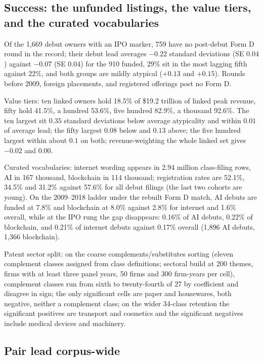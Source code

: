 \subsection{Success: the unfunded listings, the value tiers, and the curated vocabularies}

Of the 1{,}669 debut owners with an IPO marker, 759 have no post-debut
Form D round in the record; their debut lead averages $-0.22$ standard
deviations (SE $0.04$) against $-0.07$ (SE $0.04$) for the 910 funded,
29\% sit in the most lagging fifth against 22\%, and both groups are
mildly atypical ($+0.13$ and $+0.15$). Rounds before 2009, foreign
placements, and registered offerings post no Form D.

Value tiers: ten linked owners hold 18.5\% of \$19.2 trillion of linked
peak revenue, fifty hold 41.5\%, a hundred 53.6\%, five hundred 82.9\%,
a thousand 92.6\%. The ten largest sit $0.35$ standard deviations below
average atypicality and within $0.01$ of average lead; the fifty largest
$0.08$ below and $0.13$ above; the five hundred largest within about
$0.1$ on both; revenue-weighting the whole linked set gives $-0.02$ and
$0.00$.

Curated vocabularies: internet wording appears in 2.94 million
class-filing rows, AI in 167 thousand, blockchain in 114 thousand;
registration rates are 52.1\%, 34.5\% and 31.2\% against 57.6\% for all
debut filings (the last two cohorts are young). On the 2009--2018 ladder
under the rebuilt Form D match, AI debuts are funded at 7.8\% and
blockchain at 8.0\% against 2.8\% for internet and 1.6\% overall, while
at the IPO rung the gap disappears: 0.16\% of AI debuts, 0.22\% of
blockchain, and 0.21\% of internet debuts against 0.17\% overall
(1{,}896 AI debuts, 1{,}366 blockchain).

Patent sector split: on the coarse complements/substitutes sorting
(eleven complement classes assigned from class definitions; sectoral
build at 200 themes, firms with at least three panel years, 50 firms and
300 firm-years per cell), complement classes run from sixth to
twenty-fourth of 27 by coefficient and disagree in sign; the only
significant cells are paper and housewares, both negative, neither a
complement class; on the wider 34-class retention the significant
positives are transport and cosmetics and the significant negatives
include medical devices and machinery.

\subsection{Pair lead corpus-wide}

